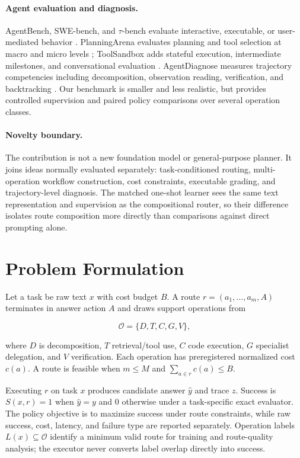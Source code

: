\documentclass[letterpaper]{article} %
\begin{document}
\paragraph{Agent evaluation and diagnosis.}
AgentBench, SWE-bench, and $\tau$-bench evaluate interactive, executable, or user-mediated behavior \citep{liu2024agentbench,jimenez2024swebench,yao2024taubench}. PlanningArena evaluates planning and tool selection at macro and micro levels \citep{zheng2025planningarena}; ToolSandbox adds stateful execution, intermediate milestones, and conversational evaluation \citep{lu2025toolsandbox}. AgentDiagnose measures trajectory competencies including decomposition, observation reading, verification, and backtracking \citep{ou2025agentdiagnose}. Our benchmark is smaller and less realistic, but provides controlled supervision and paired policy comparisons over several operation classes.

\paragraph{Novelty boundary.}
The contribution is not a new foundation model or general-purpose planner. It joins ideas normally evaluated separately: task-conditioned routing, multi-operation workflow construction, cost constraints, executable grading, and trajectory-level diagnosis. The matched one-shot learner sees the same text representation and supervision as the compositional router, so their difference isolates route composition more directly than comparisons against direct prompting alone.

\section{Problem Formulation}

Let a task be raw text $x$ with cost budget $B$. A route $r=(a_1,\ldots,a_m,A)$ terminates in answer action $A$ and draws support operations from

\begin{equation}
\mathcal{O}=\{D,T,C,G,V\},
\end{equation}

where $D$ is decomposition, $T$ retrieval/tool use, $C$ code execution, $G$ specialist delegation, and $V$ verification. Each operation has preregistered normalized cost $c(a)$. A route is feasible when $m\leq M$ and $\sum_{a\in r}c(a)\leq B$.

Executing $r$ on task $x$ produces candidate answer $\hat{y}$ and trace $z$. Success is $S(x,r)=1$ when $\hat{y}=y$ and $0$ otherwise under a task-specific exact evaluator. The policy objective is to maximize success under route constraints, while raw success, cost, latency, and failure type are reported separately. Operation labels $L(x)\subseteq\mathcal{O}$ identify a minimum valid route for training and route-quality analysis; the executor never converts label overlap directly into success.
\end{document}

